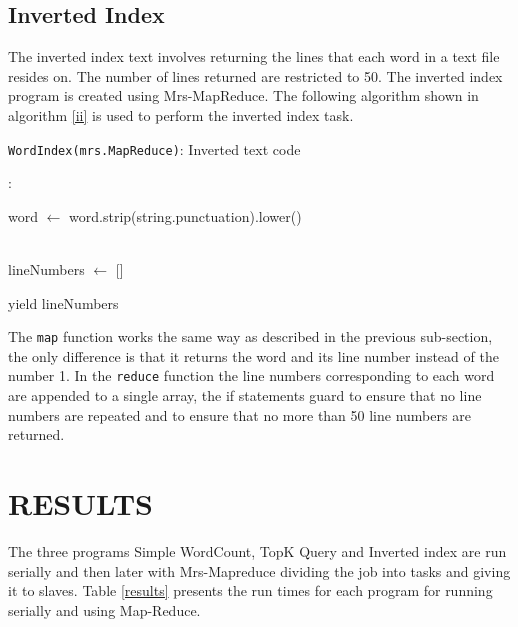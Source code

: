 \documentclass[conference]{IEEEtran}
\begin{document}
\subsection{Inverted Index}
The inverted index text involves returning the lines that each word in a text file resides on. The number of lines returned are restricted to 50. The inverted index program is created using Mrs-MapReduce. The following algorithm shown in algorithm \ref{ii} is used to perform the inverted index task.
\linesnumbered
\begin{algorithm}[h!]

\centring



\caption{\texttt{WordIndex(mrs.MapReduce)}: Inverted text code}
\vspace{0.5cm}

\map:
   
        {{word $\leftarrow$ word.strip(string.punctuation).lower()}}

\vspace{0.5cm}
\red\\
 lineNumbers $\leftarrow$ []
 
    yield lineNumbers
\label{ii}
\end{algorithm}

The \texttt{map} function works the same way as described in the previous sub-section, the only difference is that it returns the word and its line number instead of the number 1. In the \texttt{reduce} function the line numbers corresponding to each word are appended to a single array, the if statements guard to ensure that no line numbers are repeated and to ensure that no more than 50 line numbers are returned.

\section{RESULTS}
The three programs Simple WordCount, TopK Query and Inverted index are run serially and then later with Mrs-Mapreduce dividing the job into tasks and giving it to slaves. Table \ref{results} presents the run times for each program for running serially and using Map-Reduce.
\end{document}
